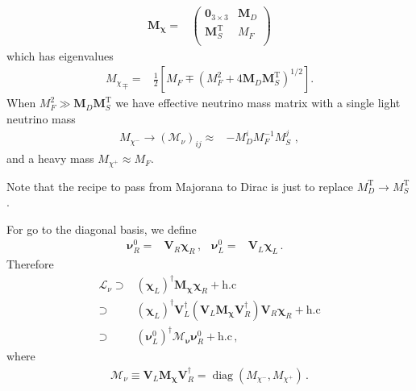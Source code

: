 \begin{align}
  \boldsymbol{M_{\chi}}=& \begin{pmatrix}
   \mathbf{0}_{3 \times 3} &            \boldsymbol{M}_D \\
   \boldsymbol{M}_S^{\operatorname{T}} & M_F \\
 \end{pmatrix}
\end{align}
which has eigenvalues
\begin{align}
{  {M_{\chi}}}_\mp=&\frac{1}{2} \left[ M_F \mp \left( M_F^2 + 4   \boldsymbol{M}_D   \boldsymbol{M}_S^{\operatorname{T}}  \right)^{1/2} \right].
\end{align}
When $M_F^2 \gg \boldsymbol{M}_D  \boldsymbol{M}_S ^{\operatorname{T}} $ we have effective neutrino mass matrix with a single light neutrino mass
\begin{align}
M_{\chi^-}\to  \left( \mathcal{M}_{\nu} \right)_{ij} \approx&-   M_D^i M_F^{-1} M_S^j\,     \,,
\end{align}
and a heavy mass $ M_{\chi^+} \approx M_F$.

Note that the recipe to pass from Majorana to Dirac is just to replace $M_D^{\operatorname{T}}\to M_S^{\operatorname{T}} $.

For go to the diagonal basis, we define
\begin{align}
  \boldsymbol{\nu}_R^0=& \boldsymbol{V}_R \boldsymbol{\chi}_R\,, &   \boldsymbol{\nu}_L^0=& \boldsymbol{V}_L \boldsymbol{\chi}_L\,. &
\end{align}
Therefore
\begin{align}
   \mathcal{L}_{\nu}\supset&\left( \boldsymbol{\chi}_L \right)^\dagger \boldsymbol{M_{\chi}} \boldsymbol{\chi}_R+\text{h.c} \nonumber\\
  \supset&\left( \boldsymbol{\chi}_L \right)^\dagger \boldsymbol{V}_L^{\dagger} \left( \boldsymbol{V}_L  \boldsymbol{M_{\chi}} \boldsymbol{V}_R^{\dagger} \right) \boldsymbol{V}_R \boldsymbol{\chi}_R+\text{h.c} \nonumber\\
          \supset&\left( \boldsymbol{\nu}_L^0 \right)^\dagger   \boldsymbol{\mathcal{M}_{\nu}}  \boldsymbol{\nu}_R^{0}+\text{h.c} \,,
\end{align}
where
\begin{align}
\boldsymbol{ \mathcal{M}}_{\nu}\equiv \boldsymbol{V}_L  \boldsymbol{M_{\chi}} \boldsymbol{V}_R^{\dagger}=\operatorname{diag}(M_{\chi^{-}},M_{\chi^{+}}  ) \,.
\end{align}

